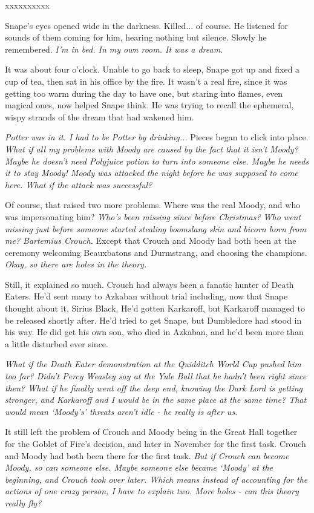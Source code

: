 \documentclass[a4paper,11pt]{article}
\begin{document}
xxxxxxxxxx

Snape's eyes opened wide in the darkness. Killed... of course. He listened for sounds of them coming for him, hearing nothing but silence. Slowly he remembered. \emph{I'm in bed. In my own room. It was a dream.}

It was about four o'clock. Unable to go back to sleep, Snape got up and fixed a cup of tea, then sat in his office by the fire. It wasn't a real fire, since it was getting too warm during the day to have one, but staring into flames, even magical ones, now helped Snape think. He was trying to recall the ephemeral, wispy strands of the dream that had wakened him.

\emph{Potter was in it. I had to be Potter by drinking...} Pieces began to click into place. \emph{What if all my problems with Moody are caused by the fact that it isn't Moody? Maybe he doesn't need Polyjuice potion to turn into someone else. Maybe he needs it to stay Moody! Moody was attacked the night before he was supposed to come here. What if the attack was successful?}

Of course, that raised two more problems. Where was the real Moody, and who was impersonating him? \emph{Who's been missing since before Christmas? Who went missing just before someone started stealing boomslang skin and bicorn horn from me? Bartemius Crouch.} Except that Crouch and Moody had both been at the ceremony welcoming Beauxbatons and Durmstrang, and choosing the champions. \emph{Okay, so there are holes in the theory.}

Still, it explained so much. Crouch had always been a fanatic hunter of Death Eaters. He'd sent many to Azkaban without trial including, now that Snape thought about it, Sirius Black. He'd gotten Karkaroff, but Karkaroff managed to be released shortly after. He'd tried to get Snape, but Dumbledore had stood in his way. He did get his own son, who died in Azkaban, and he'd been more than a little disturbed ever since.

\emph{What if the Death Eater demonstration at the Quidditch World Cup pushed him too far? Didn't Percy Weasley say at the Yule Ball that he hadn't been right since then? What if he finally went off the deep end, knowing the Dark Lord is getting stronger, and Karkaroff and I would be in the same place at the same time? That would mean `Moody's' threats aren't idle - he really is after us.}

It still left the problem of Crouch and Moody being in the Great Hall together for the Goblet of Fire's decision, and later in November for the first task. Crouch and Moody had both been there for the first task. \emph{But if Crouch can become Moody, so can someone else. Maybe someone else became `Moody' at the beginning, and Crouch took over later. Which means instead of accounting for the actions of one crazy person, I have to explain two. More holes - can this theory really fly?}
\end{document}
